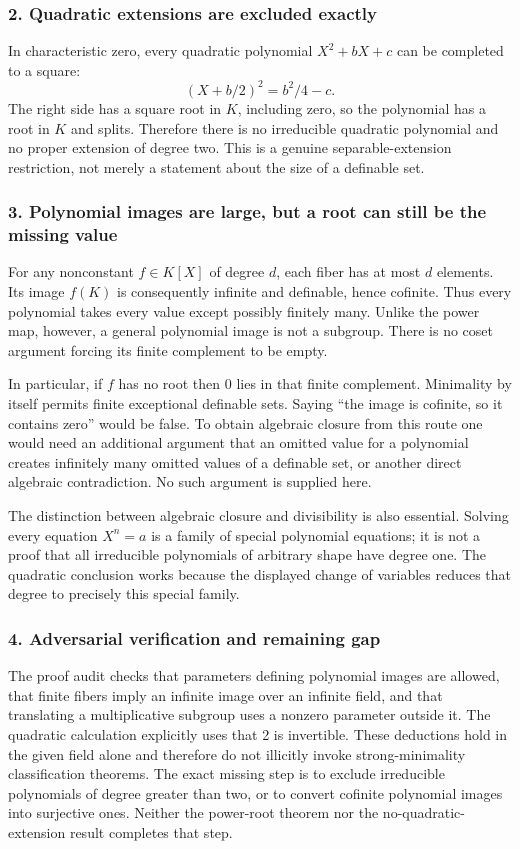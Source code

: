 \documentclass[11pt,a4paper]{article}
\begin{document}
\subsubsection{2. Quadratic extensions are excluded exactly}
In characteristic zero, every quadratic polynomial $X^2+bX+c$ can be completed to a square:
\[(X+b/2)^2=b^2/4-c.
\]
The right side has a square root in $K$, including zero, so the polynomial has a root in $K$ and splits. Therefore there is no irreducible quadratic polynomial and no proper extension of degree two. This is a genuine separable-extension restriction, not merely a statement about the size of a definable set.

\subsubsection{3. Polynomial images are large, but a root can still be the missing value}
For any nonconstant $f\in K[X]$ of degree $d$, each fiber has at most $d$ elements. Its image $f(K)$ is consequently infinite and definable, hence cofinite. Thus every polynomial takes every value except possibly finitely many. Unlike the power map, however, a general polynomial image is not a subgroup. There is no coset argument forcing its finite complement to be empty.

In particular, if $f$ has no root then $0$ lies in that finite complement. Minimality by itself permits finite exceptional definable sets. Saying ``the image is cofinite, so it contains zero'' would be false. To obtain algebraic closure from this route one would need an additional argument that an omitted value for a polynomial creates infinitely many omitted values of a definable set, or another direct algebraic contradiction. No such argument is supplied here.

The distinction between algebraic closure and divisibility is also essential. Solving every equation $X^n=a$ is a family of special polynomial equations; it is not a proof that all irreducible polynomials of arbitrary shape have degree one. The quadratic conclusion works because the displayed change of variables reduces that degree to precisely this special family.

\subsubsection{4. Adversarial verification and remaining gap}
The proof audit checks that parameters defining polynomial images are allowed, that finite fibers imply an infinite image over an infinite field, and that translating a multiplicative subgroup uses a nonzero parameter outside it. The quadratic calculation explicitly uses that 2 is invertible. These deductions hold in the given field alone and therefore do not illicitly invoke strong-minimality classification theorems. The exact missing step is to exclude irreducible polynomials of degree greater than two, or to convert cofinite polynomial images into surjective ones. Neither the power-root theorem nor the no-quadratic-extension result completes that step.
\end{document}
